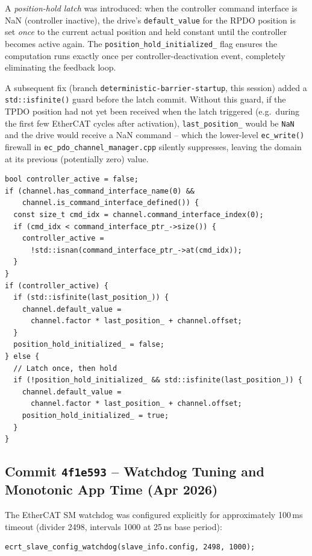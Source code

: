\documentclass[11pt,a4paper]{article}
\begin{document}
A \emph{position-hold latch} was introduced: when the controller command
interface is NaN (controller inactive), the drive's \texttt{default\_value}
for the RPDO position is set \emph{once} to the current actual position and
held constant until the controller becomes active again.  The
\texttt{position\_hold\_initialized\_} flag ensures the computation runs
exactly once per controller-deactivation event, completely eliminating the
feedback loop.

A subsequent fix (branch \texttt{deterministic-barrier-startup}, this session)
added a \texttt{std::isfinite()} guard before the latch commit.  Without this
guard, if the TPDO position had not yet been received when the latch triggered
(e.g.\ during the first few EtherCAT cycles after activation),
\texttt{last\_position\_} would be \texttt{NaN} and the drive would receive a
NaN command -- which the lower-level \texttt{ec\_write()} firewall in
\texttt{ec\_pdo\_channel\_manager.cpp} silently suppresses, leaving the domain
at its previous (potentially zero) value.

\begin{lstlisting}[caption={Position-hold latch in \texttt{processData()}}]
bool controller_active = false;
if (channel.has_command_interface_name(0) &&
    channel.is_command_interface_defined()) {
  const size_t cmd_idx = channel.command_interface_index(0);
  if (cmd_idx < command_interface_ptr_->size()) {
    controller_active =
      !std::isnan(command_interface_ptr_->at(cmd_idx));
  }
}
if (controller_active) {
  if (std::isfinite(last_position_)) {
    channel.default_value =
      channel.factor * last_position_ + channel.offset;
  }
  position_hold_initialized_ = false;
} else {
  // Latch once, then hold
  if (!position_hold_initialized_ && std::isfinite(last_position_)) {
    channel.default_value =
      channel.factor * last_position_ + channel.offset;
    position_hold_initialized_ = true;
  }
}
\end{lstlisting}

\subsection{Commit \texttt{4f1e593} -- Watchdog Tuning and Monotonic App Time (Apr 2026)}

The EtherCAT SM watchdog was configured explicitly for approximately 100\,ms
timeout (divider 2498, intervals 1000 at 25\,ns base period):

\begin{lstlisting}
ecrt_slave_config_watchdog(slave_info.config, 2498, 1000);
\end{lstlisting}
\end{document}
